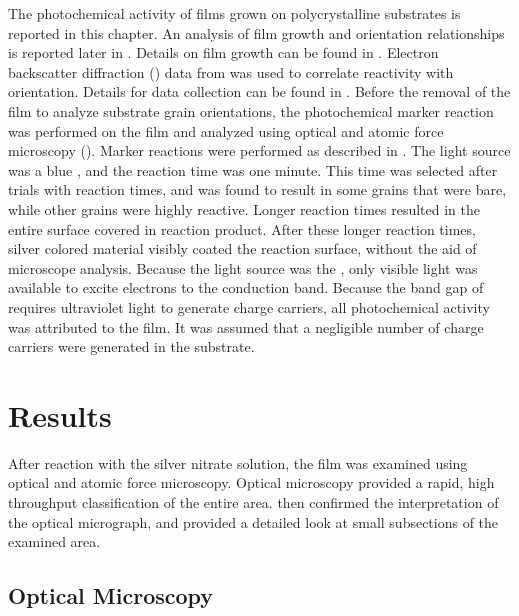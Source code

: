 The photochemical activity of  films grown on polycrystalline 
substrates is reported in this chapter. An analysis of film growth and orientation
relationships is reported later in . Details on film
growth can be found in . Electron backscatter
diffraction () data from  was used to correlate
reactivity with orientation. Details for data collection can be found in
. Before the removal of the film to analyze
substrate grain orientations, the photochemical marker reaction was performed on the film
and analyzed using optical and atomic force microscopy (). Marker reactions were
performed as described in . The light source
was a blue , and the reaction time was one minute. This time was selected after
trials with reaction times, and was found to result in some grains that were bare, while
other grains were highly reactive. Longer reaction times resulted in the entire surface
covered in reaction product. After these longer reaction times, silver colored material
visibly coated the reaction surface, without the aid of microscope analysis. Because the
light source was the , only visible light was available to excite electrons to
the conduction band. Because the band gap of  requires ultraviolet light to
generate charge carriers, all photochemical activity was attributed to the film. It was
assumed that a negligible number of charge carriers were generated in the substrate.

\section{Results}
\label{sec:poly.reac.results}

After reaction with the silver nitrate solution, the film was examined using optical and
atomic force microscopy. Optical microscopy provided a rapid, high throughput
classification of the entire area.  then confirmed the interpretation of the
optical micrograph, and provided a detailed look at small subsections of the examined
area.


\subsection{Optical Microscopy}
\label{subsec:poly.reac.optical}


